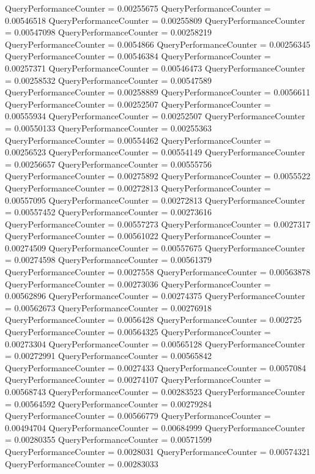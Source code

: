 \documentclass[9pt]{article}
\theoremstyle{plain}
\theoremstyle{definition}
\theoremstyle{remark}
\numberwithin{equation}{section}
\begin{document}
QueryPerformanceCounter  =  0.00255675
QueryPerformanceCounter  =  0.00546518
QueryPerformanceCounter  =  0.00255809
QueryPerformanceCounter  =  0.00547098
QueryPerformanceCounter  =  0.00258219
QueryPerformanceCounter  =  0.0054866
QueryPerformanceCounter  =  0.00256345
QueryPerformanceCounter  =  0.00546384
QueryPerformanceCounter  =  0.00257371
QueryPerformanceCounter  =  0.00546473
QueryPerformanceCounter  =  0.00258532
QueryPerformanceCounter  =  0.00547589
QueryPerformanceCounter  =  0.00258889
QueryPerformanceCounter  =  0.0056611
QueryPerformanceCounter  =  0.00252507
QueryPerformanceCounter  =  0.00555934
QueryPerformanceCounter  =  0.00252507
QueryPerformanceCounter  =  0.00550133
QueryPerformanceCounter  =  0.00255363
QueryPerformanceCounter  =  0.00554462
QueryPerformanceCounter  =  0.00256523
QueryPerformanceCounter  =  0.00554149
QueryPerformanceCounter  =  0.00256657
QueryPerformanceCounter  =  0.00555756
QueryPerformanceCounter  =  0.00275892
QueryPerformanceCounter  =  0.0055522
QueryPerformanceCounter  =  0.00272813
QueryPerformanceCounter  =  0.00557095
QueryPerformanceCounter  =  0.00272813
QueryPerformanceCounter  =  0.00557452
QueryPerformanceCounter  =  0.00273616
QueryPerformanceCounter  =  0.00557273
QueryPerformanceCounter  =  0.0027317
QueryPerformanceCounter  =  0.00561022
QueryPerformanceCounter  =  0.00274509
QueryPerformanceCounter  =  0.00557675
QueryPerformanceCounter  =  0.00274598
QueryPerformanceCounter  =  0.00561379
QueryPerformanceCounter  =  0.0027558
QueryPerformanceCounter  =  0.00563878
QueryPerformanceCounter  =  0.00273036
QueryPerformanceCounter  =  0.00562896
QueryPerformanceCounter  =  0.00274375
QueryPerformanceCounter  =  0.00562673
QueryPerformanceCounter  =  0.00276918
QueryPerformanceCounter  =  0.0056428
QueryPerformanceCounter  =  0.002725
QueryPerformanceCounter  =  0.00564325
QueryPerformanceCounter  =  0.00273304
QueryPerformanceCounter  =  0.00565128
QueryPerformanceCounter  =  0.00272991
QueryPerformanceCounter  =  0.00565842
QueryPerformanceCounter  =  0.0027433
QueryPerformanceCounter  =  0.0057084
QueryPerformanceCounter  =  0.00274107
QueryPerformanceCounter  =  0.00568743
QueryPerformanceCounter  =  0.00283523
QueryPerformanceCounter  =  0.00564592
QueryPerformanceCounter  =  0.00279284
QueryPerformanceCounter  =  0.00566779
QueryPerformanceCounter  =  0.00494704
QueryPerformanceCounter  =  0.00684999
QueryPerformanceCounter  =  0.00280355
QueryPerformanceCounter  =  0.00571599
QueryPerformanceCounter  =  0.0028031
QueryPerformanceCounter  =  0.00574321
QueryPerformanceCounter  =  0.00283033
\end{document}

